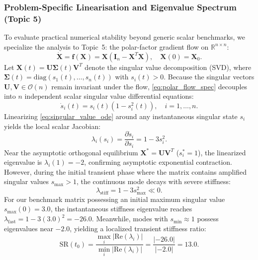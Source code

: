 \documentclass[11pt,a4paper]{article}
\theoremstyle{definition}
\theoremstyle{remark}
\begin{document}
\subsubsection{Problem-Specific Linearisation and Eigenvalue Spectrum (Topic 5)}
To evaluate practical numerical stability beyond generic scalar benchmarks, we specialize the analysis to Topic~5: the polar-factor gradient flow on $\mathbb{R}^{n \times n}$:
\begin{equation}
\label{eq:polar_flow_spec}
\dot{\mathbf{X}} = \mathbf{f}(\mathbf{X}) = \mathbf{X}\left(\mathbf{I}_n - \mathbf{X}^T \mathbf{X}\right), \quad \mathbf{X}(0) = \mathbf{X}_0.
\end{equation}
Let $\mathbf{X}(t) = \mathbf{U} \boldsymbol{\Sigma}(t) \mathbf{V}^T$ denote the singular value decomposition (SVD), where $\boldsymbol{\Sigma}(t) = \mathrm{diag}(s_1(t), \dots, s_n(t))$ with $s_i(t) > 0$. Because the singular vectors $\mathbf{U}, \mathbf{V} \in \mathcal{O}(n)$ remain invariant under the flow, \eqref{eq:polar_flow_spec} decouples into $n$ independent scalar singular value differential equations:
\begin{equation}
\label{eq:singular_value_ode}
\dot{s}_i(t) = s_i(t) \left(1 - s_i^2(t)\right), \quad i = 1, \dots, n.
\end{equation}
Linearizing \eqref{eq:singular_value_ode} around any instantaneous singular state $s_i$ yields the local scalar Jacobian:
\begin{equation}
\label{eq:singular_jacobian}
\lambda_i(s_i) = \frac{\partial \dot{s}_i}{\partial s_i} = 1 - 3 s_i^2.
\end{equation}
Near the asymptotic orthogonal equilibrium $\mathbf{X}^* = \mathbf{U}\mathbf{V}^T$ ($s_i^* = 1$), the linearized eigenvalue is $\lambda_i(1) = -2$, confirming asymptotic exponential contraction. However, during the initial transient phase where the matrix contains amplified singular values $s_{\max} > 1$, the continuous mode decays with severe stiffness:
\begin{equation}
\label{eq:lambda_min_transient}
\lambda_{\mathrm{stiff}} = 1 - 3 s_{\max}^2 \ll 0.
\end{equation}
For our benchmark matrix possessing an initial maximum singular value $s_{\max}(0) = 3.0$, the instantaneous stiffness eigenvalue reaches $\lambda_{\mathrm{fast}} = 1 - 3(3.0)^2 = -26.0$. Meanwhile, modes with $s_{\min} \approx 1$ possess eigenvalues near $-2.0$, yielding a localized transient stiffness ratio:
\begin{equation}
\label{eq:stiffness_ratio_topic5}
\mathrm{SR}(t_0) = \frac{\max_i |\mathrm{Re}(\lambda_i)|}{\min_i |\mathrm{Re}(\lambda_i)|} = \frac{|-26.0|}{|-2.0|} = 13.0.
\end{equation}
\end{document}
